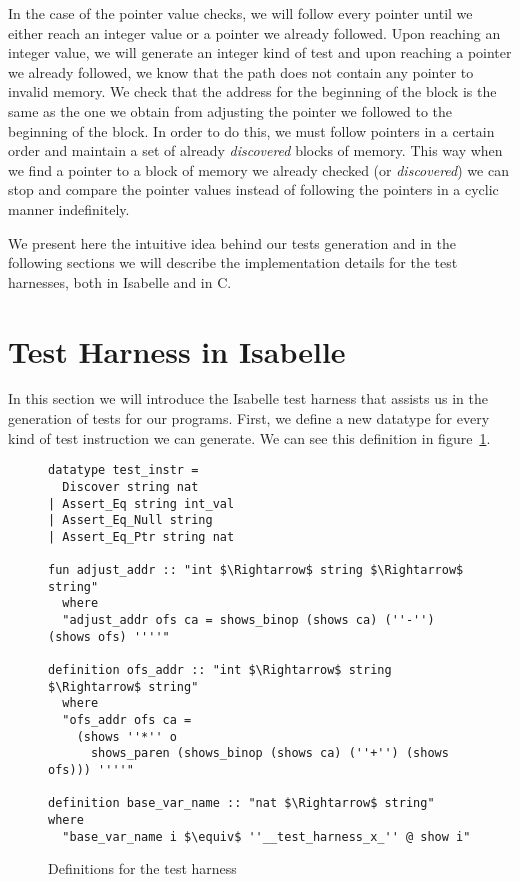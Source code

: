 In the case of the pointer value checks, we will follow every pointer until we either reach an integer value or a pointer we already followed.
Upon reaching an integer value, we will generate an integer kind of test and upon reaching a pointer we already followed, we know that the path does not contain any pointer to invalid memory.
We check that the address for the beginning of the block is the same as the one we obtain from adjusting the pointer we followed to the beginning of the block.
In order to do this, we must follow pointers in a certain order and maintain a set of already \textit{discovered} blocks of memory.
This way when we find a pointer to a block of memory we already checked (or \textit{discovered}) we can stop and compare the pointer values instead of following the pointers in a cyclic manner indefinitely.

We present here the intuitive idea behind our tests generation and in the following sections we will describe the implementation details for the test harnesses, both in Isabelle and in C.

\section{Test Harness in Isabelle}

In this section we will introduce the Isabelle test harness that assists us in the generation of tests for our programs.
First, we define a new datatype for every kind of test instruction we can generate.
We can see this definition in figure~\ref{fig:test_harness_datatype}.


\begin{figure}
\begin{lstlisting}[mathescape=true]
datatype test_instr =
  Discover string nat
| Assert_Eq string int_val
| Assert_Eq_Null string
| Assert_Eq_Ptr string nat

fun adjust_addr :: "int $\Rightarrow$ string $\Rightarrow$ string"
  where
  "adjust_addr ofs ca = shows_binop (shows ca) (''-'') (shows ofs) ''''"

definition ofs_addr :: "int $\Rightarrow$ string $\Rightarrow$ string"
  where
  "ofs_addr ofs ca =
    (shows ''*'' o
      shows_paren (shows_binop (shows ca) (''+'') (shows ofs))) ''''"

definition base_var_name :: "nat $\Rightarrow$ string" where
  "base_var_name i $\equiv$ ''__test_harness_x_'' @ show i"
\end{lstlisting}

\caption{Definitions for the test harness}
\label{fig:test_harness_datatype}
\end{figure}

